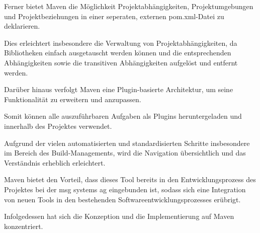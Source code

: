 Ferner bietet Maven die Möglichkeit Projektabhängigkeiten, Projektumgebungen und Projektbeziehungen in einer seperaten, externen pom.xml-Datei zu deklarieren. \cite[S. 3]{varanasi_introducing_2019} 

Dies erleichtert insbesondere die Verwaltung von Projektabhängigkeiten, da Bibliotheken einfach ausgetauscht werden können und die entsprechenden Abhängigkeiten sowie die transitiven Abhängigkeiten aufgelöst und entfernt werden.

Darüber hinaus verfolgt Maven eine Plugin-basierte Architektur, um seine Funktionalität zu erweitern und anzupassen. \cite[S. 28]{spiller_maven_2011} 

Somit können alle auszuführbaren Aufgaben als Plugins heruntergeladen und innerhalb des Projektes verwendet. 

Aufgrund der vielen automatisierten und standardisierten Schritte insbesondere im Bereich des Build-Managements, wird die Navigation übersichtlich und das Verständnis erheblich erleichtert.  

Maven bietet den Vorteil, dass dieses Tool bereits in den Entwicklungsprozess des Projektes bei der msg systems ag eingebunden ist, sodass sich eine Integration von neuen Tools in den bestehenden Softwareentwicklungsprozesses erübrigt.

Infolgedessen hat sich die Konzeption und die Implementierung auf Maven konzentriert.  

